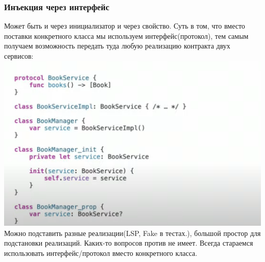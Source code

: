 \documentclass{article}
\begin{document}
    \subsubsection{Инъекция через интерфейс}
    Может быть и через инициализатор и через свойство. Суть в том, что вместо поставки конкретного класса мы используем интерфейс(протокол), тем самым получаем возможность передать туда любую реализацию контракта двух сервисов: 
    \newline
    \includegraphics[scale = 0.5]{pic/Снимок экрана 2023-07-31 в 01.16.18.png}
    \newline
    Можно подставить разные реализации(LSP, Fake в тестах.), большой простор для подстановки реализаций. Каких-то вопросов против не имеет. Всегда стараемся использовать интерфейс/протокол вместо конкретного класса. 
\end{document}
